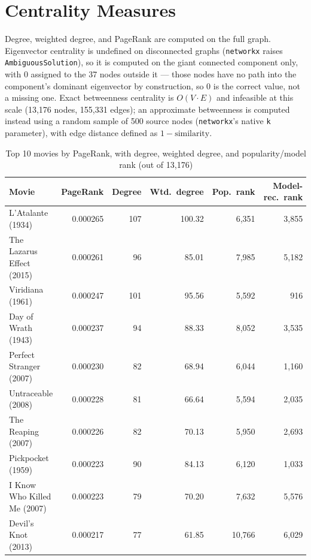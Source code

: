 \documentclass[12pt,a4paper]{article}
\begin{document}
\section{Centrality Measures}

Degree, weighted degree, and PageRank are computed on the full graph. Eigenvector centrality is
undefined on disconnected graphs (\texttt{networkx} raises \texttt{AmbiguousSolution}), so it is
computed on the giant connected component only, with 0 assigned to the 37 nodes outside it --- those
nodes have no path into the component's dominant eigenvector by construction, so 0 is the correct
value, not a missing one. Exact betweenness centrality is $O(V\cdot E)$ and infeasible at this scale
(13,176 nodes, 155,331 edges); an approximate betweenness is computed instead using a random sample
of 500 source nodes (\texttt{networkx}'s native \texttt{k} parameter), with edge distance defined as
$1 - \text{similarity}$.

\begin{table}[H]
\centering
\caption{Top 10 movies by PageRank, with degree, weighted degree, and popularity/model rank (out of 13,176)}
\label{tab:top_pagerank}
\begin{tabular}{lrrrrr}
\toprule
\textbf{Movie} & \textbf{PageRank} & \textbf{Degree} & \textbf{Wtd.\ degree} & \textbf{Pop.\ rank} & \textbf{Model-rec.\ rank} \\
\midrule
L'Atalante (1934)            & 0.000265 & 107 & 100.32 & 6,351  & 3,855 \\
The Lazarus Effect (2015)    & 0.000261 &  96 &  85.01 & 7,985  & 5,182 \\
Viridiana (1961)             & 0.000247 & 101 &  95.56 & 5,592  &   916 \\
Day of Wrath (1943)          & 0.000237 &  94 &  88.33 & 8,052  & 3,535 \\
Perfect Stranger (2007)      & 0.000230 &  82 &  68.94 & 6,044  & 1,160 \\
Untraceable (2008)           & 0.000228 &  81 &  66.64 & 5,594  & 2,035 \\
The Reaping (2007)           & 0.000226 &  82 &  70.13 & 5,950  & 2,693 \\
Pickpocket (1959)            & 0.000223 &  90 &  84.13 & 6,120  & 1,033 \\
I Know Who Killed Me (2007)  & 0.000223 &  79 &  70.20 & 7,632  & 5,576 \\
Devil's Knot (2013)          & 0.000217 &  77 &  61.85 & 10,766 & 6,029 \\
\bottomrule
\end{tabular}
\end{table}
\end{document}
